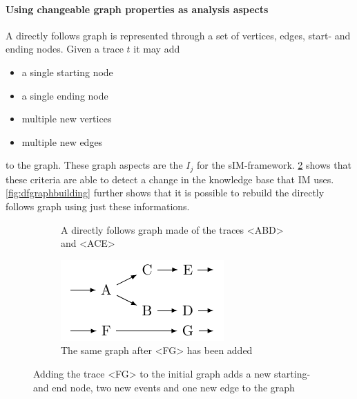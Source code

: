 \documentclass[
	a4paper,
	pagesize,
	pdftex,
	12pt,
	twoside, %
	BCOR=5mm, %
	ngerman,
	fleqn,
	final,
	]{scrartcl}
\begin{document}
\paragraph{Using changeable graph properties as analysis aspects}
A directly follows graph is represented through a set of vertices, edges, start- and ending nodes. Given a trace $t$ it may add
\begin{itemize}
\item a single starting node
\item a single ending node
\item multiple new vertices
\item multiple new edges
\end{itemize}
to the graph.
These graph aspects are the $I_j$ for the sIM-framework. \ref{fig:dfgraphchanging} shows that these criteria are able to detect a change in the knowledge base that IM uses. \ref{fig:dfgraphbuilding} further shows that it is possible to rebuild the directly follows graph using just these informations.
\begin{figure}[h]
	\begin{subfigure}[t]{.5\textwidth}
	  \centering
	  \caption{A directly follows graph made of the traces <ABD> and <ACE>}
	\end{subfigure}%
	\begin{subfigure}[t]{.45\textwidth}
	  \centering
	  \includegraphics[width=.9\linewidth]{img/dfgraph_added_trace.pdf}
	  \caption{The same graph after <FG> has been added}
	  	\label{fig:dfgraphchangingafter}
	\end{subfigure}
	\caption{Adding the trace <FG> to the initial graph adds a new starting- and end node, two new events and one new edge to the graph}
	\label{fig:dfgraphchanging}
\end{figure}
\end{document}
